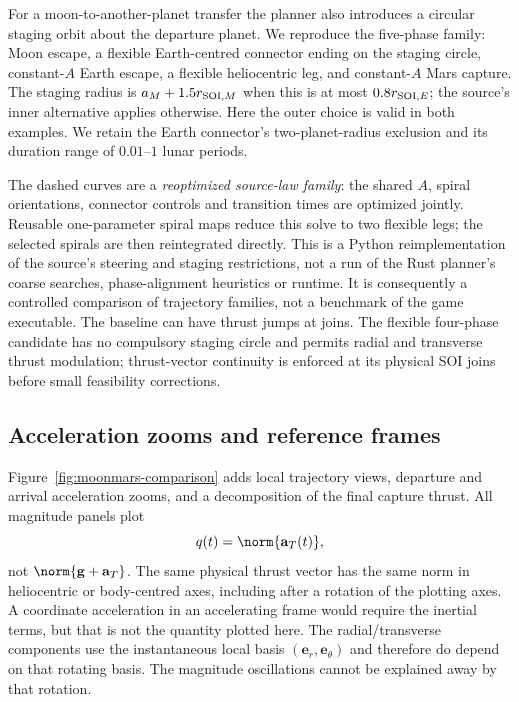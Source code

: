 For a moon-to-another-planet transfer the planner also introduces a circular staging orbit about the departure planet. We reproduce the five-phase family: Moon escape, a flexible Earth-centred connector ending on the staging circle, constant-$A$ Earth escape, a flexible heliocentric leg, and constant-$A$ Mars capture. The staging radius is $a_M+1.5r_{{\rm SOI},M}$ when this is at most $0.8r_{{\rm SOI},E}$; the source's inner alternative applies otherwise. Here the outer choice is valid in both examples. We retain the Earth connector's two-planet-radius exclusion and its duration range of $0.01$--$1$ lunar periods.

The dashed curves are a \emph{reoptimized source-law family}: the shared $A$, spiral orientations, connector controls and transition times are optimized jointly. Reusable one-parameter spiral maps reduce this solve to two flexible legs; the selected spirals are then reintegrated directly. This is a Python reimplementation of the source's steering and staging restrictions, not a run of the Rust planner's coarse searches, phase-alignment heuristics or runtime. It is consequently a controlled comparison of trajectory families, not a benchmark of the game executable. The baseline can have thrust jumps at joins. The flexible four-phase candidate has no compulsory staging circle and permits radial and transverse thrust modulation; thrust-vector continuity is enforced at its physical SOI joins before small feasibility corrections.

\subsection{Acceleration zooms and reference frames}
Figure~\ref{fig:moonmars-comparison} adds local trajectory views, departure and arrival acceleration zooms, and a decomposition of the final capture thrust. All magnitude panels plot
\begin{equation}
 q(t)=\norm{\mathbf a_T(t)},
\end{equation}
not $\norm{\mathbf g+\mathbf a_T}$. The same physical thrust vector has the same norm in heliocentric or body-centred axes, including after a rotation of the plotting axes. A coordinate acceleration in an accelerating frame would require the inertial terms, but that is not the quantity plotted here. The radial/transverse components use the instantaneous local basis $(\mathbf e_r,\mathbf e_\theta)$ and therefore do depend on that rotating basis. The magnitude oscillations cannot be explained away by that rotation.

